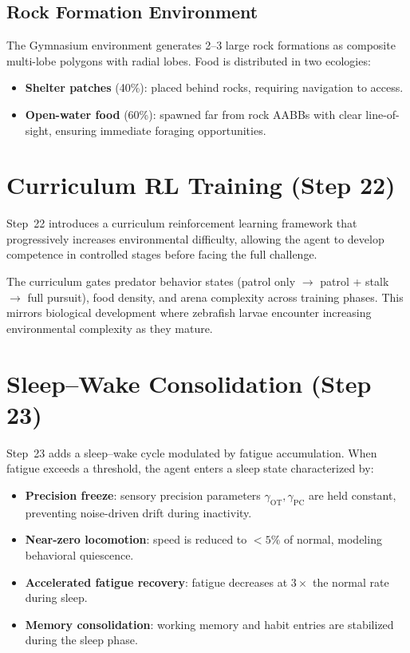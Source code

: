 \documentclass[11pt,a4paper]{article}
\begin{document}
\subsection{Rock Formation Environment}

The Gymnasium environment generates 2--3 large rock formations as
composite multi-lobe polygons with radial lobes.
Food is distributed in two ecologies:
\begin{itemize}[nosep]
  \item \textbf{Shelter patches} (40\%): placed behind rocks, requiring
    navigation to access.
  \item \textbf{Open-water food} (60\%): spawned far from rock AABBs
    with clear line-of-sight, ensuring immediate foraging opportunities.
\end{itemize}

\section{Curriculum RL Training (Step 22)}\label{sec:curriculum}

Step~22 introduces a curriculum reinforcement learning framework that
progressively increases environmental difficulty, allowing the agent
to develop competence in controlled stages before facing the full challenge.

The curriculum gates predator behavior states (patrol only $\to$
patrol + stalk $\to$ full pursuit), food density, and arena complexity
across training phases.
This mirrors biological development where zebrafish larvae encounter
increasing environmental complexity as they mature.

\section{Sleep--Wake Consolidation (Step 23)}\label{sec:sleep}

Step~23 adds a sleep--wake cycle modulated by fatigue accumulation.
When fatigue exceeds a threshold, the agent enters a sleep state
characterized by:
\begin{itemize}[nosep]
  \item \textbf{Precision freeze}: sensory precision parameters
    $\gamma_\text{OT}, \gamma_\text{PC}$ are held constant, preventing
    noise-driven drift during inactivity.
  \item \textbf{Near-zero locomotion}: speed is reduced to
    $<5\%$ of normal, modeling behavioral quiescence.
  \item \textbf{Accelerated fatigue recovery}: fatigue decreases at
    $3\times$ the normal rate during sleep.
  \item \textbf{Memory consolidation}: working memory and habit
    entries are stabilized during the sleep phase.
\end{itemize}
\end{document}
